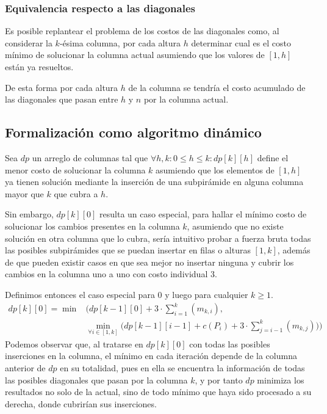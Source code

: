 \documentclass{article}
\theoremstyle{default}
\begin{document}
		\subsubsection{Equivalencia respecto a las diagonales}
			Es posible replantear el problema de los costos de las diagonales como, al considerar la $k$-ésima columna, por cada altura $h$ determinar cual es el costo mínimo de solucionar la columna actual asumiendo que los valores de $[1,h]$ están ya resueltos.

			De esta forma por cada altura $h$ de la columna se tendría el costo acumulado de las diagonales que pasan entre $h$ y $n$ por la columna actual.
		
	\subsection{Formalización como algoritmo dinámico}
		Sea $dp$ un arreglo de columnas tal que $\forall h,k: 0 \leq h \leq k: dp[k][h]$ define el menor costo de solucionar la columna $k$ asumiendo que los elementos de $[1,h]$ ya tienen solución mediante la inserción de una subpirámide en alguna columna mayor que $k$ que cubra a $h$.

		Sin embargo, $dp[k][0]$ resulta un caso especial, para hallar el mínimo costo de solucionar los cambios presentes en la columna $k$, asumiendo que no existe solución 
		en otra columna que lo cubra, sería intuitivo probar a fuerza bruta todas las posibles subpirámides que se puedan insertar en filas o alturas $[1,k]$, además de que pueden existir casos en que sea mejor no insertar ninguna y cubrir los cambios en la columna uno a uno con costo individual $3$.

		Definimos entonces el caso especial para $0$ y luego para cualquier $k \geq 1$.
		\begin{align}
			\nonumber
			dp[k][0] = \min & \Bigg(
						dp[k-1][0]
					  	+ 3 \cdot \sum\limits_{i=1}^{k}{(m_{k,i})},
			\\
			\label{dp_0_all}
					 	&\min_{\forall i \in [1,k]} \biggl(
						dp[k-1][i-1] + c(P_i) + 3\cdot\!\sum\limits_{j=i-1}^{k}(m_{k,j})
					\biggr)\Bigg)
		\end{align}
		Podemos observar que, al tratarse en $dp[k][0]$ con todas las posibles inserciones en la columna, el mínimo en cada iteración depende de la columna anterior de $dp$ en su totalidad, pues en ella se encuentra la información de todas las posibles diagonales que pasan por la columna $k$, y por tanto $dp$ minimiza los resultados no solo de la actual, sino de todo mínimo que haya sido procesado a su derecha, donde cubrirían sus inserciones.
\end{document}
